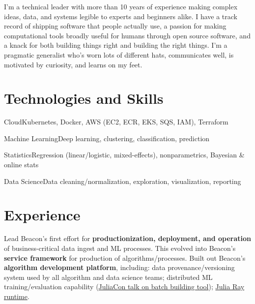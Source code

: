 \documentclass[10pt,colorlinks,urlcolor=gray]{moderncv}
\begin{document}
\makecvtitle

I'm a technical leader with more than 10 years of experience making complex ideas, data, and
systems legible to experts and beginners alike.  I have a track record of shipping software
that people actually use, a passion for making computational tools broadly useful for humans
through open source software, and a knack for both building things right and building the
right things.  I'm a pragmatic generalist who's worn lots of different hats, communicates
well, is motivated by curiosity, and learns on my feet.

\section{Technologies and Skills}

%
           {Cloud}{Kubernetes, Docker, AWS (EC2, ECR, EKS, SQS, IAM), Terraform}

%
           {Machine Learning}{Deep learning, clustering, classification, prediction}

%
           {Statistics}{Regression (linear/logistic, mixed-effects), nonparametrics,
                        Bayesian \& online stats}

%
           {Data Science}{Data cleaning/normalization, exploration, visualization, reporting}

\section{Experience}

 {Lead Beacon's first effort for \textbf{productionization,
    deployment, and operation} of business-critical data ingest and ML processes.  This
  evolved into Beacon's \textbf{service framework} for production of algorithms/processes.
  Built out Beacon's \textbf{algorithm development platform}, including: data
  provenance/versioning system used by all algorithm and data science teams; distributed ML
  training/evaluation capability
  (\href{https://www.youtube.com/watch?v=szjMOSuUYU4}{JuliaCon talk on batch building
    tool}); \href{https://github.com/beacon-biosignals/ray_core_worker_julia_jll.jl}{Julia
    Ray runtime}.}
\end{document}
